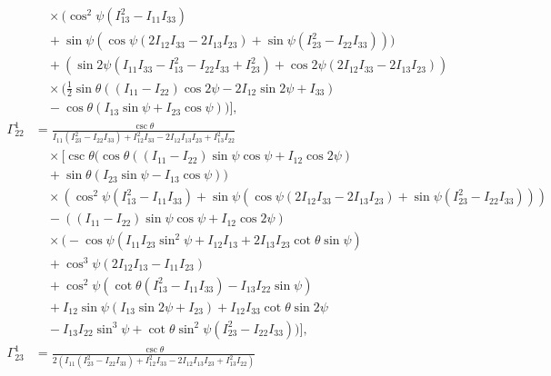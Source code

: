\documentclass[lineno, pdflatex,sn-mathphys-ay]{sn-jnl}
\theoremstyle{thmstyleone}%
\theoremstyle{thmstyletwo}%
\theoremstyle{thmstylethree}%
\begin{document}
\begin{appendices}
\begin{align}
    &\quad \times \Big(\cos ^2\psi \left(I_{13}^2-I_{11} I_{33}\right) \nonumber \\
    &\quad +\sin \psi \left(\cos \psi (2 I_{12} I_{33}-2 I_{13} I_{23})+\sin \psi \left(I_{23}^2-I_{22} I_{33}\right)\right)\Big) \nonumber \\
    &\quad +\left(\sin 2\psi \left(I_{11} I_{33}-I_{13}^2-I_{22} I_{33}+I_{23}^2\right)+\cos 2\psi (2 I_{12} I_{33}-2 I_{13} I_{23})\right) \nonumber \\
    &\quad \times \bigg(\frac{1}{2} \sin \theta ((I_{11}-I_{22}) \cos 2\psi-2 I_{12} \sin 2\psi+I_{33}) \nonumber \\
    &\quad -\cos \theta (I_{13} \sin \psi+I_{23} \cos \psi)\bigg) \bigg], \nonumber \\
    \Gamma^{1}_{22} &= \frac{\csc \theta}{I_{11} \left(I_{23}^2-I_{22} I_{33}\right)+I_{12}^2 I_{33}-2 I_{12} I_{13} I_{23}+I_{13}^2 I_{22}} \nonumber \\
    &\quad \times \bigg[ \csc \theta \Big(\cos \theta ((I_{11}-I_{22}) \sin \psi \cos \psi+I_{12} \cos 2\psi) \nonumber \\
    &\quad +\sin \theta (I_{23} \sin \psi-I_{13} \cos \psi)\Big) \nonumber \\
    &\quad \times \left(\cos ^2\psi \left(I_{13}^2-I_{11} I_{33}\right)+\sin \psi \left(\cos \psi (2 I_{12} I_{33}-2 I_{13} I_{23})+\sin \psi \left(I_{23}^2-I_{22} I_{33}\right)\right)\right) \nonumber \\
    &\quad -((I_{11}-I_{22}) \sin \psi \cos \psi+I_{12} \cos 2\psi) \nonumber \\
    &\quad \times \bigg(-\cos \psi \left(I_{11} I_{23} \sin ^2\psi+I_{12} I_{13}+2 I_{13} I_{23} \cot \theta \sin \psi\right) \nonumber \\
    &\quad +\cos ^3\psi (2 I_{12} I_{13}-I_{11} I_{23}) \nonumber \\
    &\quad +\cos ^2\psi \left(\cot \theta \left(I_{13}^2-I_{11} I_{33}\right)-I_{13} I_{22} \sin \psi\right) \nonumber \\
    &\quad +I_{12} \sin \psi (I_{13} \sin 2\psi+I_{23}) +I_{12} I_{33} \cot \theta \sin 2\psi \nonumber \\
    &\quad -I_{13} I_{22} \sin ^3\psi+\cot \theta \sin ^2\psi \left(I_{23}^2-I_{22} I_{33}\right)\bigg) \bigg], \nonumber \\
    \Gamma^{1}_{23} &= \frac{\csc \theta}{2 \left(I_{11} \left(I_{23}^2-I_{22} I_{33}\right)+I_{12}^2 I_{33}-2 I_{12} I_{13} I_{23}+I_{13}^2 I_{22}\right)} \nonumber \\

\end{align}
\end{appendices}
\end{document}
